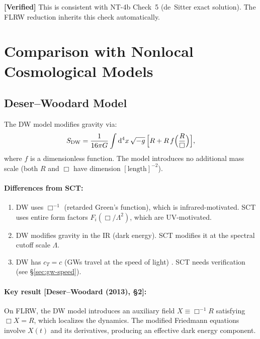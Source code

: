 \documentclass[12pt,a4paper]{article}
\theoremstyle{definition}
\theoremstyle{remark}
\newcommand{\dd}{\mathrm{d}}
\newcommand{\fromlit}[1]{\textcolor{blue!70!black}{\textsf{[#1]}}}
\newcommand{\verified}[1]{%
  \par\smallskip\noindent
  \colorbox{green!10}{\parbox{\dimexpr\linewidth-2\fboxsep}{%
    \textcolor{green!50!black}{\textbf{[Verified]}} #1}}%
  \par\smallskip}
\begin{document}
\verified{This is consistent with NT-4b Check~5 (de~Sitter exact
solution). The FLRW reduction inherits this check automatically.}

\section{Comparison with Nonlocal Cosmological Models}
\label{sec:comparison}

\subsection{Deser--Woodard Model}\label{sec:DW}

The DW model \cite{DW07,DW13,DW19} modifies gravity via:
\begin{equation}\label{eq:DW-action}
  S_{\mathrm{DW}} = \frac{1}{16\pi G}\int\dd^4 x\,\sqrt{-g}\,
  \Bigl[R + R\,f\Bigl(\frac{R}{\Box}\Bigr)\Bigr],
\end{equation}
where $f$ is a dimensionless function. The model introduces no
additional mass scale (both $R$ and $\Box$ have dimension
$[\mathrm{length}]^{-2}$).

\paragraph{Differences from SCT:}
\begin{enumerate}[nosep]
  \item DW uses $\Box^{-1}$ (retarded Green's function), which is
    infrared-motivated. SCT uses entire form factors
    $F_i(\Box/\Lambda^2)$, which are UV-motivated.
  \item DW modifies gravity in the IR (dark energy). SCT modifies
    it at the spectral cutoff scale $\Lambda$.
  \item DW has $c_T = c$ (GWs travel at the speed of light)
    \cite{NLA18}. SCT needs verification (see \S\ref{sec:gw-speed}).
\end{enumerate}

\paragraph{Key result \fromlit{Deser--Woodard (2013), \S2}:}
On FLRW, the DW model introduces an auxiliary field
$X \equiv \Box^{-1}R$ satisfying $\Box X = R$, which localizes the
dynamics. The modified Friedmann equations involve $X(t)$ and its
derivatives, producing an effective dark energy component.
\end{document}
